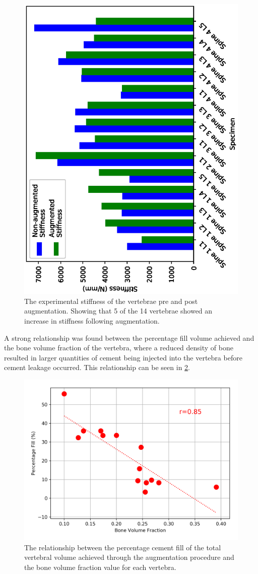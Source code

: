 \begin{figure}[h!]
  \centering
 
\includegraphics[width=.7\textwidth,angle=270]{Chapters/Chapter_HT_images/aug_non_aug_stiffness}
	\caption{The experimental stiffness of the vertebrae pre and post
augmentation. Showing that 5 of the 14 vertebrae showed an increase in
stiffness following augmentation.}
  \label{fig:aug_non_aug_stiffness}
\end{figure}

A strong relationship was found between the percentage fill volume achieved and the
bone volume fraction of the vertebra, where a reduced density of bone resulted
in larger quantities of cement being injected into the vertebra before cement
leakage occurred.
This relationship can be seen in \cref{fig:cmt_fill_vs_bvtv}.

\begin{figure}[ht!]
  \centering
 
\includegraphics[width=.7\textwidth]{Chapters/Chapter_HT_images/cmt_fill_vs_bvtv.png}
	\caption{The relationship between the percentage cement fill of the total
vertebral volume  achieved through the augmentation procedure and the bone
volume fraction value for each vertebra. }
  \label{fig:cmt_fill_vs_bvtv}
\end{figure}

